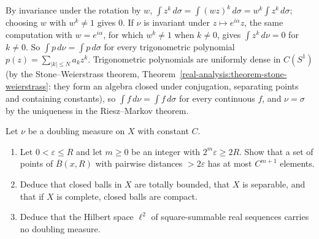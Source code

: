 \begin{solution}
By invariance under the rotation by $w$, $\int z^k\,d\sigma = \int(wz)^k\,d\sigma = w^k\int z^k\,d\sigma$; choosing $w$ with $w^k \neq 1$ gives $0$. If $\nu$ is invariant under $z \mapsto e^{i\alpha}z$, the
same computation with $w = e^{i\alpha}$, for which $w^k \neq 1$ when $k \neq 0$, gives $\int z^k\,d\nu = 0$ for $k \neq 0$. So $\int p\,d\nu = \int p\,d\sigma$ for every trigonometric polynomial
$p(z) = \sum_{|k| \leq N}a_kz^k$. Trigonometric polynomials are uniformly dense in $C(S^1)$ (by the Stone--Weierstrass theorem, Theorem~\ref{real-analysis:theorem-stone-weierstrass}: they form an algebra closed under conjugation, separating points and containing
constants), so $\int f\,d\nu = \int f\,d\sigma$ for every continuous $f$, and $\nu = \sigma$ by the uniqueness in the Riesz--Markov theorem.
\end{solution}

\begin{exercise}\label{radon-measures:exercise-doubling-totally-bounded}
Let $\nu$ be a doubling measure on $X$ with constant $C$.
\begin{enumerate}
\item Let $0 < \varepsilon \leq R$ and let $m \geq 0$ be an integer with $2^m\varepsilon \geq 2R$. Show that a set of points of $\overline{B}(x, R)$ with pairwise distances $> 2\varepsilon$ has at most $C^{m+1}$
elements.
\item Deduce that closed balls in $X$ are totally bounded, that $X$ is separable, and that if $X$ is complete, closed balls are compact.
\item Deduce that the Hilbert space $\ell^2$ of square-summable real sequences carries no doubling measure.
\end{enumerate}
\end{exercise}

